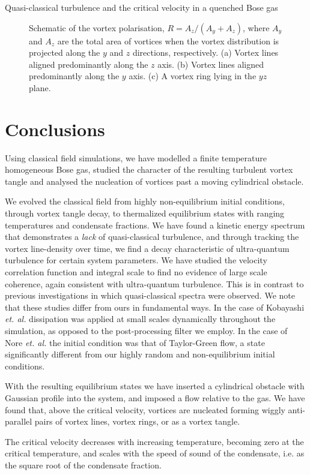 \begin{chapter}{\label{cha:nonequib}Quasi-classical turbulence and the critical velocity in a quenched Bose gas}
\begin{figure}
\caption{\label{fig:pol_R} Schematic of the vortex polarisation, $R=A_z/(A_y+A_z)$, where $A_y$ and $A_z$ are the total area of vortices when the vortex distribution is projected along the $y$ and $z$ directions, respectively.  (a) Vortex lines aligned predominantly along the $z$ axis. (b) Vortex lines aligned predominantly along the $y$ axis. (c) A vortex ring lying in the $yz$ plane.}
\end{figure}
\section{Conclusions\label{sec:conclusions}}

Using classical field simulations, we have modelled a finite temperature homogeneous Bose gas, 
studied the character of the resulting turbulent vortex tangle and analysed the nucleation
of vortices past a moving cylindrical obstacle.

We evolved the classical field from highly non-equilibrium initial conditions, through vortex tangle decay, to thermalized equilibrium states with ranging temperatures and condensate fractions. We have found a kinetic energy spectrum that demonstrates a {\it lack} of quasi-classical turbulence, and through tracking the vortex line-density over time, we find a decay characteristic of ultra-quantum turbulence for certain system parameters. We have studied the velocity correlation function and integral scale to find no evidence of large scale coherence, again consistent with ultra-quantum turbulence. This is in contrast to previous investigations \cite{Nore,Kobayashi} in which quasi-classical spectra were observed. We note that these studies differ from ours in fundamental ways. In the case of Kobayashi {\it et. al.} dissipation was applied at small scales dynamically throughout the simulation, as opposed to the post-processing filter we employ. In the case of Nore {\it et. al.} the initial condition was that of Taylor-Green flow, a state significantly different from our highly random and non-equilibrium initial conditions.

With the resulting equilibrium states we have inserted a cylindrical obstacle with Gaussian profile into the system, and imposed a flow relative to the gas.  We have found that, above the critical velocity, vortices are nucleated forming wiggly anti-parallel pairs of vortex lines, vortex rings, or as a vortex tangle.

The critical velocity decreases with increasing temperature, becoming zero at the critical temperature, and scales with the speed of sound of the condensate, i.e. as the square root of the condensate fraction.
\end{chapter}